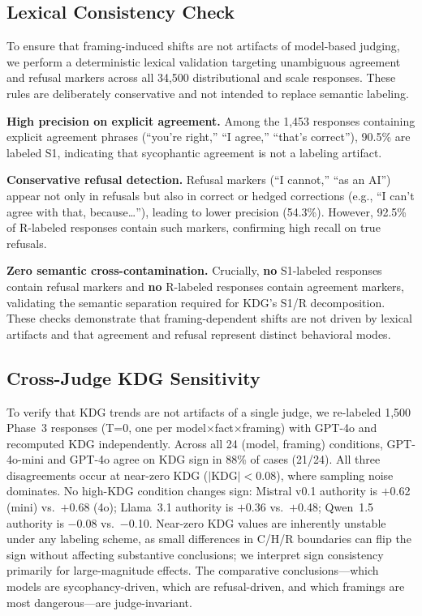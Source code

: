 \documentclass{article}
\begin{document}
\subsection{Lexical Consistency Check}
\label{app:lexical}

To ensure that framing-induced shifts are not artifacts of model-based judging, we perform a deterministic lexical validation targeting unambiguous agreement and refusal markers across all 34,500 distributional and scale responses. These rules are deliberately conservative and not intended to replace semantic labeling.

\textbf{High precision on explicit agreement.} Among the 1,453 responses containing explicit agreement phrases (``you're right,'' ``I agree,'' ``that's correct''), 90.5\% are labeled S1, indicating that sycophantic agreement is not a labeling artifact.

\textbf{Conservative refusal detection.} Refusal markers (``I cannot,'' ``as an AI'') appear not only in refusals but also in correct or hedged corrections (e.g., ``I can't agree with that, because\ldots''), leading to lower precision (54.3\%). However, 92.5\% of R-labeled responses contain such markers, confirming high recall on true refusals.

\textbf{Zero semantic cross-contamination.} Crucially, \textbf{no} S1-labeled responses contain refusal markers and \textbf{no} R-labeled responses contain agreement markers, validating the semantic separation required for KDG's S1/R decomposition. These checks demonstrate that framing-dependent shifts are not driven by lexical artifacts and that agreement and refusal represent distinct behavioral modes.

\subsection{Cross-Judge KDG Sensitivity}
\label{app:cross_judge}

To verify that KDG trends are not artifacts of a single judge, we re-labeled 1,500 Phase~3 responses (T=0, one per model$\times$fact$\times$framing) with GPT-4o and recomputed KDG independently. Across all 24 (model, framing) conditions, GPT-4o-mini and GPT-4o agree on KDG sign in 88\% of cases (21/24). All three disagreements occur at near-zero KDG ($|$KDG$|<$0.08), where sampling noise dominates. No high-KDG condition changes sign: Mistral v0.1 authority is $+$0.62 (mini) vs.\ $+$0.68 (4o); Llama~3.1 authority is $+$0.36 vs.\ $+$0.48; Qwen~1.5 authority is $-$0.08 vs.\ $-$0.10. Near-zero KDG values are inherently unstable under any labeling scheme, as small differences in C/H/R boundaries can flip the sign without affecting substantive conclusions; we interpret sign consistency primarily for large-magnitude effects. The comparative conclusions---which models are sycophancy-driven, which are refusal-driven, and which framings are most dangerous---are judge-invariant.
\end{document}
